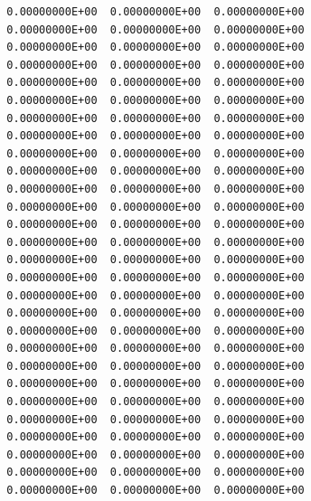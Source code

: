 \begin{footnotesize}
\begin{verbatim}
  0.00000000E+00  0.00000000E+00  0.00000000E+00
  0.00000000E+00  0.00000000E+00  0.00000000E+00
  0.00000000E+00  0.00000000E+00  0.00000000E+00
  0.00000000E+00  0.00000000E+00  0.00000000E+00
  0.00000000E+00  0.00000000E+00  0.00000000E+00
  0.00000000E+00  0.00000000E+00  0.00000000E+00
  0.00000000E+00  0.00000000E+00  0.00000000E+00
  0.00000000E+00  0.00000000E+00  0.00000000E+00
  0.00000000E+00  0.00000000E+00  0.00000000E+00
  0.00000000E+00  0.00000000E+00  0.00000000E+00
  0.00000000E+00  0.00000000E+00  0.00000000E+00
  0.00000000E+00  0.00000000E+00  0.00000000E+00
  0.00000000E+00  0.00000000E+00  0.00000000E+00
  0.00000000E+00  0.00000000E+00  0.00000000E+00
  0.00000000E+00  0.00000000E+00  0.00000000E+00
  0.00000000E+00  0.00000000E+00  0.00000000E+00
  0.00000000E+00  0.00000000E+00  0.00000000E+00
  0.00000000E+00  0.00000000E+00  0.00000000E+00
  0.00000000E+00  0.00000000E+00  0.00000000E+00
  0.00000000E+00  0.00000000E+00  0.00000000E+00
  0.00000000E+00  0.00000000E+00  0.00000000E+00
  0.00000000E+00  0.00000000E+00  0.00000000E+00
  0.00000000E+00  0.00000000E+00  0.00000000E+00
  0.00000000E+00  0.00000000E+00  0.00000000E+00
  0.00000000E+00  0.00000000E+00  0.00000000E+00
  0.00000000E+00  0.00000000E+00  0.00000000E+00
  0.00000000E+00  0.00000000E+00  0.00000000E+00
  0.00000000E+00  0.00000000E+00  0.00000000E+00
\end{verbatim}
\end{footnotesize}

